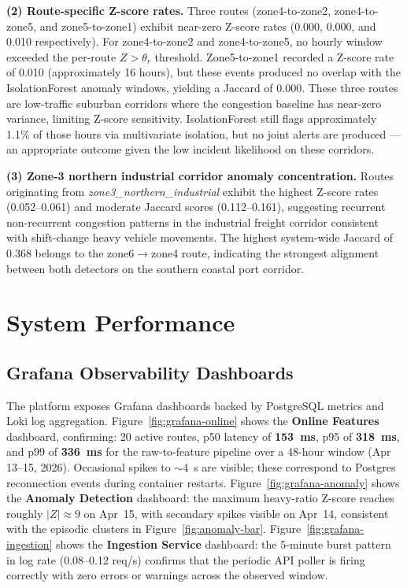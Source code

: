 \textbf{(2) Route-specific Z-score rates.}
Three routes (zone4-to-zone2, zone4-to-zone5, and zone5-to-zone1) exhibit
near-zero Z-score rates (0.000, 0.000, and 0.010 respectively). For
zone4-to-zone2 and zone4-to-zone5, no hourly window exceeded the per-route
$Z>\theta_r$ threshold. Zone5-to-zone1 recorded a Z-score rate of 0.010
(approximately 16 hours), but these events produced no overlap with the
IsolationForest anomaly windows, yielding a Jaccard of 0.000. These three
routes are low-traffic suburban corridors where the congestion baseline has
near-zero variance, limiting Z-score sensitivity. IsolationForest still flags
approximately 1.1\% of those hours via multivariate isolation, but no joint
alerts are produced ---
an appropriate outcome given the low incident likelihood on these corridors.

\textbf{(3) Zone-3 northern industrial corridor anomaly concentration.}
Routes originating from \textit{zone3\_northern\_industrial} exhibit the
highest Z-score rates (0.052--0.061) and moderate Jaccard scores
(0.112--0.161), suggesting recurrent non-recurrent congestion patterns
in the industrial freight corridor consistent with shift-change heavy
vehicle movements. The highest system-wide Jaccard of 0.368 belongs to
the zone6$\to$zone4 route, indicating the strongest alignment between
both detectors on the southern coastal port corridor.

\section{System Performance}
\label{sec:sys-perf}

\subsection{Grafana Observability Dashboards}

The platform exposes Grafana dashboards backed by PostgreSQL metrics and
Loki log aggregation. Figure~\ref{fig:grafana-online} shows the \textbf{Online
Features} dashboard, confirming: 20 active routes, p50 latency of
\textbf{153~ms}, p95 of \textbf{318~ms}, and p99 of \textbf{336~ms} for the
raw-to-feature pipeline over a 48-hour window (Apr 13--15, 2026). Occasional
spikes to $\sim$4~s are visible; these correspond to Postgres reconnection
events during container restarts. Figure~\ref{fig:grafana-anomaly} shows the
\textbf{Anomaly Detection} dashboard: the maximum heavy-ratio Z-score reaches
roughly $|Z| \approx 9$ on Apr~15, with secondary spikes visible on Apr~14,
consistent with the episodic clusters in Figure~\ref{fig:anomaly-bar}. Figure~\ref{fig:grafana-ingestion} shows the
\textbf{Ingestion Service} dashboard: the 5-minute burst pattern in log rate
(0.08--0.12 req/s) confirms that the periodic API poller is firing correctly
with zero errors or warnings across the observed window.

